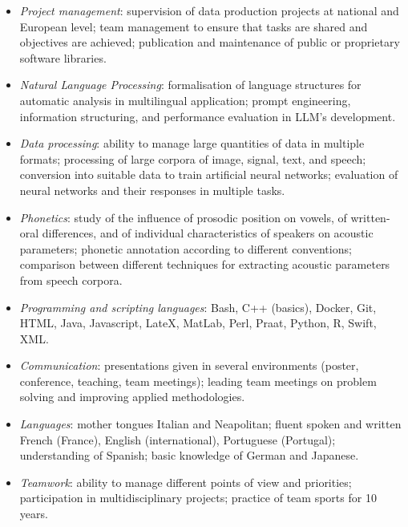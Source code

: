 \documentclass[pdftex, a4paper, 11pt, twoside, english]{article}
\begin{document}
\begin{itemize}
	\item[\faTasks] \textit{Project management}: supervision of data production projects at national and European level; team management to ensure that tasks are shared and objectives are achieved; publication and maintenance of public or proprietary software libraries.
\vspace{-0.5em}
	\item[\faCenter{spell-check}] \textit{Natural Language Processing}: formalisation of language structures for automatic analysis in multilingual application; prompt engineering, information structuring, and performance evaluation in LLM's development.
\vspace{-0.5em}
	\item[\faTable] \textit{Data processing}: ability to manage large quantities of data in multiple formats; processing of large corpora of image, signal, text, and speech; conversion into suitable data to train artificial neural networks; evaluation of neural networks and their responses in multiple tasks.
\vspace{-0.5em}
	\item[\faCommentDots] \textit{Phonetics}: study of the influence of prosodic position on vowels, of written-oral differences, and of individual characteristics of speakers on acoustic parameters; phonetic annotation according to different conventions; comparison between different techniques for extracting acoustic parameters from speech corpora.
\vspace{-0.5em}
	\item[\faLaptopCode] \textit{Programming and scripting languages}: Bash, C++ (basics), Docker, Git, HTML, Java, Javascript, LateX, MatLab, Perl, Praat, Python, R, Swift, XML.
\vspace{-0.5em}
	\item[\faFulcrum] \textit{Communication}: presentations given in several environments (poster, conference, teaching, team meetings); leading team meetings on problem solving and improving applied methodologies.
\vspace{-0.5em}
	\item[\faLanguage] \textit{Languages}: mother tongues Italian and Neapolitan; fluent spoken and written French (France), English (international), Portuguese (Portugal); understanding of Spanish; basic knowledge of German and Japanese.
\vspace{-0.5em}
	\item[\faRing] \textit{Teamwork}: ability to manage different points of view and priorities; participation in multidisciplinary projects; practice of team sports for 10 years.
\end{itemize}
\vspace{-1.5em}
\end{document}
